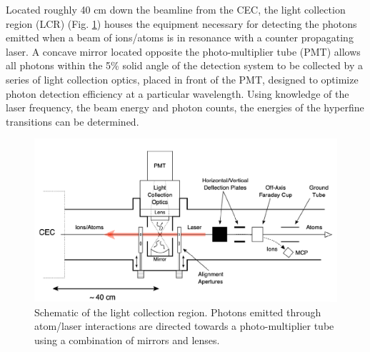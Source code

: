 Located roughly 40 cm down the beamline from the CEC, the light collection region (LCR) (Fig. \ref{LCR}) houses the equipment necessary for detecting the photons emitted when a beam of ions/atoms is in resonance with a counter propagating laser. A concave mirror located opposite the photo-multiplier tube (PMT) allows all photons within the 5\% solid angle of the detection system to be collected by a series of light collection optics, placed in front of the PMT, designed to optimize photon detection efficiency at a particular wavelength. Using knowledge of the laser frequency, the beam energy and photon counts, the energies of the hyperfine transitions can be determined. 
\begin{figure}[t!]
\includegraphics[scale=0.35]{Laser_spec_triumf/LCR.png}
\caption{\small Schematic of the light collection region. Photons emitted through atom/laser interactions are directed towards a photo-multiplier tube using a combination of mirrors and lenses. \citep{CFBS}}
\label{LCR}
\end{figure}

%